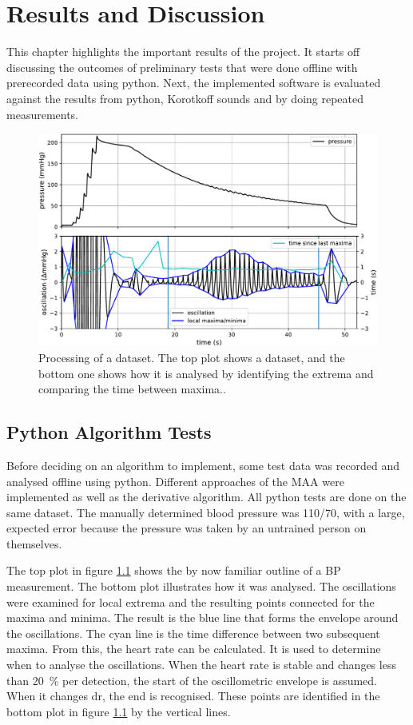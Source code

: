 \chapter{Results and Discussion}\label{cp:res}
This chapter highlights the important results of the project. It starts off discussing the outcomes of preliminary tests that were done offline with prerecorded data using python. Next, the implemented software is evaluated against the results from python, Korotkoff sounds and by doing repeated measurements. 


\begin{figure}[ht]
\centering
\includegraphics[width=\textwidth]{figures/mmHg_Signal.pdf}
\caption{Processing of a dataset. The top plot shows a dataset, and the bottom one shows how it is analysed by identifying the extrema and comparing the time between maxima..}
\label{fig:pyOverview}
\end{figure}

\section{Python Algorithm Tests}
Before deciding on an algorithm to implement, some test data was recorded and analysed offline using python. Different approaches of the MAA were implemented as well as the derivative algorithm. All python tests are done on the same dataset. The manually determined blood pressure was 110/70, with a large, expected error because the pressure was taken by an untrained person on themselves. 

The top plot in figure \ref{fig:pyOverview} shows the by now familiar outline of a BP measurement. The bottom plot illustrates how it was analysed. The oscillations were examined for local extrema and the resulting points connected for the maxima and minima. The result is the blue line that forms the envelope around the oscillations. The cyan line is the time difference between two subsequent maxima. From this, the heart rate can be calculated. It is used to determine when to analyse the oscillations. When the heart rate is stable and changes less than \SI{20}{\percent} per detection, the start of the oscillometric envelope is assumed. When it changes dr, the end is recognised. These points are identified in the bottom plot in figure \ref{fig:pyOverview} by the vertical lines. 

